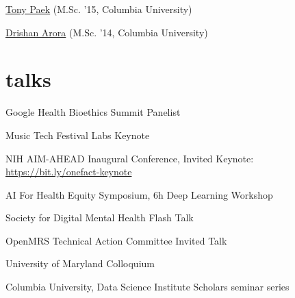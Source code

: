 \documentclass[4pt, letterpaper]{article}
\begin{document}
\href{https://www.linkedin.com/in/tonypaek}{Tony Paek} (M.Sc. '15, Columbia University)

\href{https://www.linkedin.com/in/drishanarora}{Drishan Arora} (M.Sc. '14, Columbia University)%

\section*{talks}

 Google Health Bioethics Summit Panelist

 Music Tech Festival Labs Keynote

 NIH AIM-AHEAD Inaugural Conference, Invited Keynote: \url{https://bit.ly/onefact-keynote}

 AI For Health Equity Symposium, 6h Deep Learning Workshop

Society for Digital Mental Health Flash Talk 

OpenMRS Technical Action Committee Invited Talk



University of Maryland Colloquium

Columbia University, Data Science Institute Scholars seminar series
\end{document}
